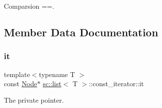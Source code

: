 Comparsion ==. 



\subsection{Member Data Documentation}
\mbox{\label{classsc_1_1list_1_1const__iterator_a9fe1633dfc296c9c1f61ac24d515e648}} 
\subsubsection{\texorpdfstring{it}{it}}
{\footnotesize\ttfamily template$<$typename T $>$ \\
const \hyperlink{structsc_1_1list_1_1_node}{Node}$\ast$ \hyperlink{classsc_1_1list}{sc\+::list}$<$ T $>$\+::const\+\_\+iterator\+::it\hspace{0.3cm}{\ttfamily [private]}}



The private pointer. 

